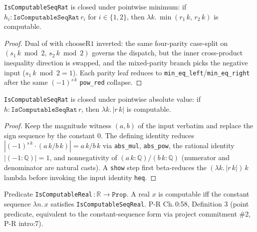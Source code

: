 \begin{lemma}
  \label{lem:l1_isComputableSeqRat_min}
  \leanok
  \texttt{IsComputableSeqRat} is closed under pointwise minimum: if $h_i : \texttt{IsComputableSeqRat}\,r_i$ for $i \in \{1,2\}$, then $\lambda k.\,\min(r_1\,k,\,r_2\,k)$ is computable.
\end{lemma}
\begin{proof}\leanok
  Dual of  with $\mathrm{chooseR1}$ inverted: the same four-parity case-split on $(s_1\,k \bmod 2,\, s_2\,k \bmod 2)$ governs the dispatch, but the inner cross-product inequality direction is swapped, and the mixed-parity branch picks the negative input ($s_1\,k \bmod 2 = 1$). Each parity leaf reduces to \texttt{min\_eq\_left}/\texttt{min\_eq\_right} after the same $(-1)^{s\,k}$ \texttt{pow\_red} collapse.
\end{proof}

\begin{lemma}
  \label{lem:l1_isComputableSeqRat_abs}
  \leanok
  \texttt{IsComputableSeqRat} is closed under pointwise absolute value: if $h : \texttt{IsComputableSeqRat}\,r$, then $\lambda k.\,|r\,k|$ is computable.
\end{lemma}
\begin{proof}\leanok
  Keep the magnitude witness $(a, b)$ of the input verbatim and replace the sign sequence by the constant $0$. The defining identity reduces $|(-1)^{s\,k} \cdot (a\,k / b\,k)| = a\,k / b\,k$ via \texttt{abs\_mul}, \texttt{abs\_pow}, the rational identity $|(-1 : \mathbb{Q})| = 1$, and nonnegativity of $(a\,k : \mathbb{Q}) / (b\,k : \mathbb{Q})$ (numerator and denominator are natural casts). A \texttt{show} step first beta-reduces the $(\lambda k.\,|r\,k|)\,k$ lambda before invoking the input identity \texttt{heq}.
\end{proof}

\begin{definition}
  \label{def:l1_isComputableReal}
  \leanok
  Predicate \texttt{IsComputableReal}\,$: \mathbb{R} \to \texttt{Prop}$. A real $x$ is computable iff the constant sequence $\lambda n.\,x$ satisfies \texttt{IsComputableSeqReal}. P-R Ch.\,0:58, Definition 3 (point predicate, equivalent to the constant-sequence form via project commitment \#2, P-R intro:7).
\end{definition}

